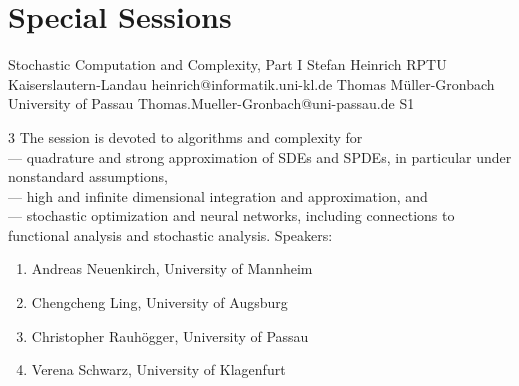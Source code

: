 \chapter{Special Sessions}

\begin{session}
 {Stochastic Computation and Complexity, Part I}%
 {Stefan Heinrich}%
 {RPTU Kaiserslautern-Landau}%
 {heinrich@informatik.uni-kl.de}%
 {Thomas M\"uller-Gronbach}%
 {University of Passau}%
 {Thomas.Mueller-Gronbach@uni-passau.de}%
 {S1}%
 {}%

 {3} %
 The session is devoted to algorithms and complexity for\\
 --- quadrature and strong approximation of SDEs and SPDEs, in particular under nonstandard assumptions,\\
 --- high and infinite dimensional integration and approximation, and\\
 --- stochastic optimization and neural networks,
 including connections to functional analysis and stochastic analysis.
 \medskip
 Speakers:
 \begin{enumerate}
 \item Andreas Neuenkirch, University of Mannheim
 \item Chengcheng Ling, University of Augsburg
 \item Christopher Rauh\"ogger, University of Passau
 \item Verena Schwarz, University of Klagenfurt
 \end{enumerate}
\end{session}



\clearpage

